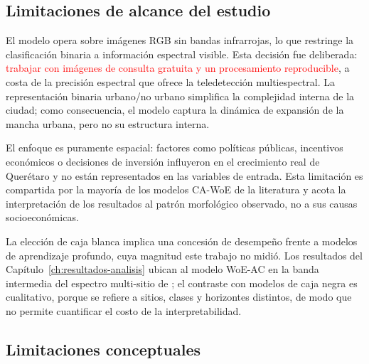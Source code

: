 \subsection{Limitaciones de alcance del estudio}

El modelo opera sobre imágenes RGB sin bandas infrarrojas, lo que restringe la clasificación binaria a información espectral visible. Esta decisión fue deliberada: \textcolor{red}{trabajar con imágenes de consulta gratuita y un procesamiento reproducible}, a costa de la precisión espectral que ofrece la teledetección multiespectral. La representación binaria urbano/no urbano simplifica la complejidad interna de la ciudad; como consecuencia, el modelo captura la dinámica de expansión de la mancha urbana, pero no su estructura interna.

El enfoque es puramente espacial: factores como políticas públicas, incentivos económicos o decisiones de inversión influyeron en el crecimiento real de Querétaro y no están representados en las variables de entrada. Esta limitación es compartida por la mayoría de los modelos CA-WoE de la literatura y acota la interpretación de los resultados al patrón morfológico observado, no a sus causas socioeconómicas.

La elección de caja blanca implica una concesión de desempeño frente a modelos de aprendizaje profundo, cuya magnitud este trabajo no midió. Los resultados del Capítulo~\ref{ch:resultados-analisis} ubican al modelo WoE-AC en la banda intermedia del espectro multi-sitio de \textcite{pontius2008comparing}; el contraste con modelos de caja negra es cualitativo, porque se refiere a sitios, clases y horizontes distintos, de modo que no permite cuantificar el costo de la interpretabilidad.

\subsection{Limitaciones conceptuales}

